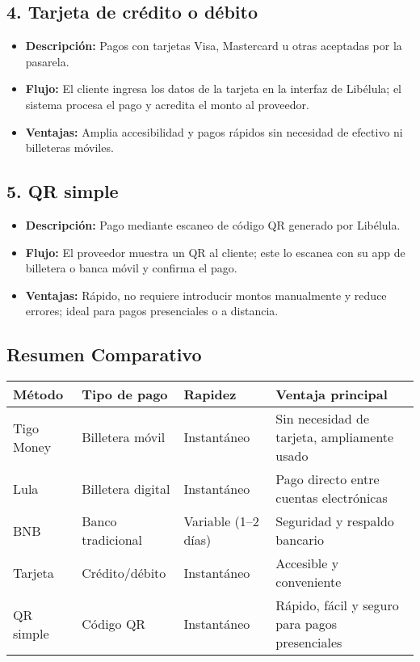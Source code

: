 \subsection*{4. Tarjeta de crédito o débito}
\begin{itemize}
	\item \textbf{Descripción:} Pagos con tarjetas Visa, Mastercard u otras aceptadas por la pasarela.
	\item \textbf{Flujo:} El cliente ingresa los datos de la tarjeta en la interfaz de Libélula; el sistema procesa el pago y acredita el monto al proveedor.
	\item \textbf{Ventajas:} Amplia accesibilidad y pagos rápidos sin necesidad de efectivo ni billeteras móviles.
\end{itemize}

\subsection*{5. QR simple}
\begin{itemize}
	\item \textbf{Descripción:} Pago mediante escaneo de código QR generado por Libélula.
	\item \textbf{Flujo:} El proveedor muestra un QR al cliente; este lo escanea con su app de billetera o banca móvil y confirma el pago.
	\item \textbf{Ventajas:} Rápido, no requiere introducir montos manualmente y reduce errores; ideal para pagos presenciales o a distancia.
\end{itemize}

\subsection*{Resumen Comparativo}
\begin{center}
	\begin{tabular}{>{\raggedright}p{3.5cm} p{3cm} p{3cm} p{5cm}}
		\toprule
		\textbf{Método} & \textbf{Tipo de pago} & \textbf{Rapidez} & \textbf{Ventaja principal} \\
		\midrule
		Tigo Money & Billetera móvil & Instantáneo & Sin necesidad de tarjeta, ampliamente usado \\
		Lula & Billetera digital & Instantáneo & Pago directo entre cuentas electrónicas \\
		BNB & Banco tradicional & Variable (1--2 días) & Seguridad y respaldo bancario \\
		Tarjeta & Crédito/débito & Instantáneo & Accesible y conveniente \\
		QR simple & Código QR & Instantáneo & Rápido, fácil y seguro para pagos presenciales \\
		\bottomrule
	\end{tabular}
\end{center}
